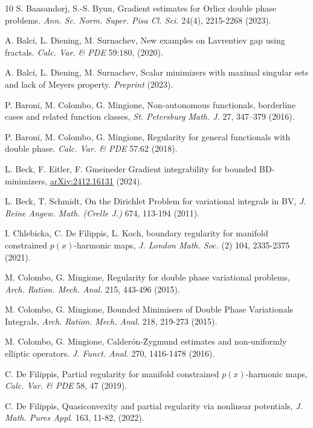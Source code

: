 \documentclass[a4paper]{amsart}
\theoremstyle{plain}  %
\numberwithin{equation}{section}
\begin{document}
\begin{thebibliography}{10}
 S. Baasandorj, S.-S. Byun, Gradient estimates for Orlicz double phase problems. \emph{Ann. Sc. Norm. Super. Pisa Cl. Sci.} 24(4), 2215-2268 (2023).

 A. Balci, L. Diening, M. Surnachev, 
New examples on Lavrentiev gap using fractals. \emph{Calc. Var. \& PDE} 59:180, (2020).

 A. Balci, L. Diening, M. Surnachev, Scalar minimizers with maximal singular sets and lack of Meyers property. \emph{Preprint} (2023). 

 P. Baroni, M. Colombo, G. Mingione, Non-autonomous functionals, borderline cases and related function classes, \emph{St. Petersburg Math. J.} 27, 347–379 (2016).

 P. Baroni, M. Colombo, G. Mingione, Regularity for general functionals with double phase. \emph{Calc. Var. \& PDE} 57:62 (2018).
 
 L. Beck, F. Eitler, F. Gmeineder Gradient integrability for bounded BD-minimizers, \href{https://arxiv.org/abs/2412.16131}{	arXiv:2412.16131} (2024).

 L. Beck, T. Schmidt, On the Dirichlet Problem for variational integrals in BV, \emph{ J. Reine Angew. Math. (Crelle J.)} 674, 113-194 (2011).


 I. Chlebicka, C. De Filippis, L. Koch, boundary regularity for manifold constrained $p(x)$-harmonic maps, \emph{J. London Math. Soc.} (2) 104, 2335-2375 (2021).

 M. Colombo, G. Mingione, Regularity for double phase variational problems, \emph{Arch. Ration. Mech. Anal.} 215, 443-496 (2015).


 M. Colombo, G. Mingione, Bounded Minimisers of Double Phase Variationals Integrals, \emph{Arch. Ration. Mech. Anal.} 218, 219-273 (2015).

 M. Colombo, G. Mingione, Calder\'on-Zygmund estimates and non-uniformly elliptic operators. \emph{J. Funct. Anal.} 270, 1416-1478 (2016).


 C. De Filippis, Partial regularity for manifold constrained $p(x)$-harmonic maps, \emph{Calc. Var. \& PDE} 58, 47 (2019).

 C. De Filippis, Quasiconvexity and partial regularity via nonlinear potentials, \emph{ J. Math. Pures Appl.} 163, 11-82, (2022).


\end{thebibliography}
\end{document}

